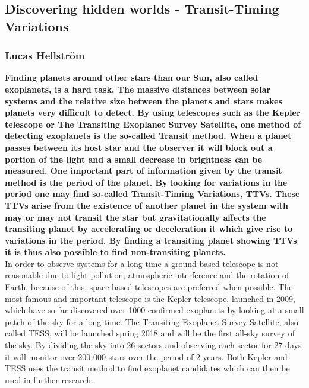 \documentclass[titlepage]{article}
\begin{document}
	\begin{center}
	\section*{Discovering hidden worlds - Transit-Timing Variations}
	\subsubsection*{Lucas Hellström}
	\end{center}
	\textbf{Finding planets around other stars than our Sun, also called exoplanets, is a hard task. The massive distances between solar systems and the relative size between the planets and stars makes planets very difficult to detect. By using telescopes such as the Kepler telescope or The Transiting Exoplanet Survey Satellite, one method of detecting exoplanets is the so-called Transit method. When a planet passes between its host star and the observer it will block out a portion of the light and a small decrease in brightness can be measured. One important part of information given by the transit method is the period of the planet. By looking for variations in the period one may find so-called Transit-Timing Variations, TTVs. These TTVs arise from the existence of another planet in the system with may or may not transit the star but gravitationally affects the transiting planet by accelerating or deceleration it which give rise to variations in the period. By finding a transiting planet showing TTVs it is thus also possible to find non-transiting planets.}\\
	
	\vspace{0.5cm}\noindent In order to observe systems for a long time a ground-based telescope is not reasonable due to light pollution, atmospheric interference and the rotation of Earth, because of this, space-based telescopes are preferred when possible. The most famous and important telescope is the Kepler telescope, launched in 2009, which have so far discovered over 1000 confirmed exoplanets  by looking at a small patch of the sky for a long time. The Transiting Exoplanet Survey Satellite, also called TESS, will be launched spring 2018 and will be the first all-sky survey of the sky. By dividing the sky into 26 sectors and observing each sector for 27 days it will monitor over 200 000 stars over the period of 2 years. Both Kepler and TESS uses the transit method to find exoplanet candidates which can then be used in further research.  	
	
\end{document}
